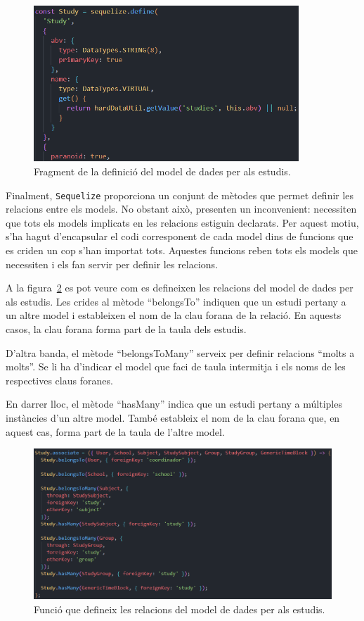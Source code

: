 \documentclass[a4paper,12pt]{ThesisStyle}
\begin{document}
\begin{figure}[H]
  \centering
  \includegraphics[width=0.89\textwidth]{assets/code/modelsDades/modelEstudipng.png}
  \caption{\label{img:modelEstudi} Fragment de la definició del model de dades per als estudis.}
\end{figure}

Finalment, \texttt{Sequelize} proporciona un conjunt de mètodes que permet definir les relacions entre els models. No obstant això, presenten un inconvenient: necessiten que tots els models implicats en les relacions estiguin declarats. Per aquest motiu, s'ha hagut d'encapsular el codi corresponent de cada model dins de funcions que es criden un cop s'han importat tots. Aquestes funcions reben tots els models que necessiten i els fan servir per definir les relacions.

A la figura~\ref{img:associate} es pot veure com es defineixen les relacions del model de dades per als estudis. Les crides al mètode ``belongsTo'' indiquen que un estudi pertany a un altre model i estableixen el nom de la clau forana de la relació. En aquests casos, la clau forana forma part de la taula dels estudis.

D'altra banda, el mètode ``belongsToMany'' serveix per definir relacions ``molts a molts''. Se li ha d'indicar el model que faci de taula intermitja i els noms de les respectives claus foranes.

En darrer lloc, el mètode ``hasMany'' indica que un estudi pertany a múltiples instàncies d'un altre model. També estableix el nom de la clau forana que, en aquest cas, forma part de la taula de l'altre model.

\begin{figure}[H]
  \centering
  \includegraphics[width=\textwidth]{assets/code/modelsDades/associate.png}
  \caption{\label{img:associate} Funció que defineix les relacions del model de dades per als estudis.}
\end{figure}
\end{document}
